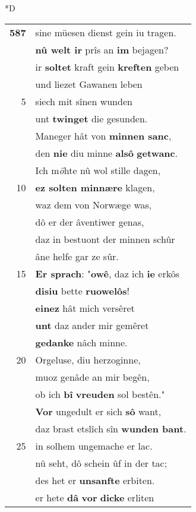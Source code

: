 \documentclass[8pt,a4paper,notitlepage]{article}
\begin{document}
\begin{table}[ht]
\begin{minipage}[t]{0.5\linewidth}
\small
\begin{center}*D
\end{center}
\begin{tabular}{rl}
\textbf{587} & sine müesen dienst gein iu tragen.\\ 
 & \textbf{nû welt ir} prîs an \textbf{im} bejagen?\\ 
 & ir \textbf{soltet} kraft gein \textbf{kreften} geben\\ 
 & und liezet Gawanen leben\\ 
5 & siech mit sînen wunden\\ 
 & unt \textbf{twinget} die gesunden.\\ 
 & Maneger hât von \textbf{minnen sanc},\\ 
 & den \textbf{nie} diu minne \textbf{alsô} \textbf{getwanc}.\\ 
 & Ich m\textit{ö}hte nû wol stille dagen,\\ 
10 & \textbf{ez solten minnære} klagen,\\ 
 & waz dem von Norwæge was,\\ 
 & dô er der âventiwer genas,\\ 
 & daz in bestuont der minnen schûr\\ 
 & âne helfe gar ze sûr.\\ 
15 & \textbf{Er sprach}: "\textbf{owê}, daz ich \textbf{ie} erkôs\\ 
 & \textbf{disiu} bette \textbf{ruowelôs}!\\ 
 & \textbf{einez} hât mich versêret\\ 
 & \textbf{unt} daz ander mir gemêret\\ 
 & \textbf{gedanke} nâch minne.\\ 
20 & Orgeluse, diu herzoginne,\\ 
 & muoz genâde an mir begên,\\ 
 & ob ich \textbf{bî} \textbf{vreuden} sol bestên."\\ 
 & \textbf{Vor} ungedult er sich \textbf{sô} want,\\ 
 & daz brast etslîch sîn \textbf{wunden bant}.\\ 
25 & in solhem ungemache er lac.\\ 
 & nû seht, dô schein ûf in der tac;\\ 
 & des het er \textbf{unsanfte} erbiten.\\ 
 & er hete \textbf{dâ} \textbf{vor} \textbf{dicke} erliten\\ 

\end{tabular}
\end{minipage}
\end{table}
\end{document}
